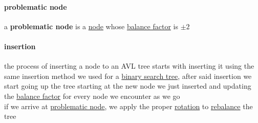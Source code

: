 \documentclass[a4paper,12pt]{article}
\begin{document}
\paragraph{problematic node}
\label{sec:org634a573}
\begin{definition}
a \textbf{problematic node} is a \hyperref[sec:orgec4976f]{node} whose \hyperref[sec:org98c9b00]{balance factor} is \(\pm2\)\\[0pt]
\end{definition}
\paragraph{insertion}
\label{sec:orgf7c2dfc}
the process of inserting a node to an AVL tree starts with inserting it using the same insertion method we used for a \hyperref[sec:orge1ff544]{binary search tree}, after said insertion we start going up the tree starting at the new node we just inserted and updating the \hyperref[sec:org98c9b00]{balance factor} for every node we encounter as we go\\[0pt]
if we arrive at \hyperref[sec:org634a573]{problematic node}, we apply the proper \hyperref[sec:orgcca3d84]{rotation} to \hyperref[sec:org224f44b]{rebalance} the tree\\[0pt]
\end{document}
